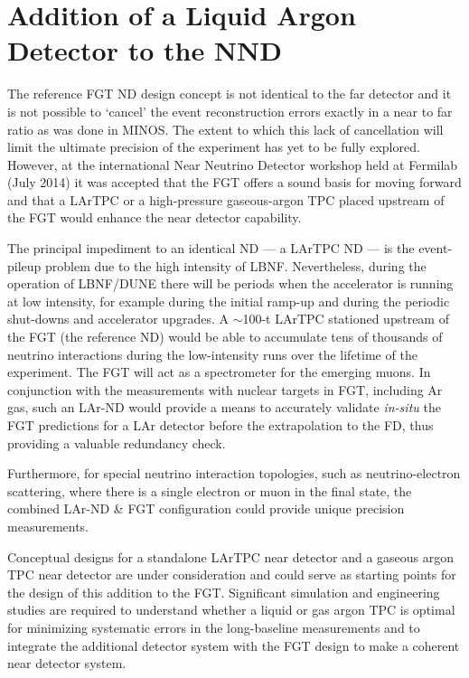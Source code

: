 \section{Addition of a Liquid Argon Detector to the NND}
\label{sec:detectors-nd-alt}

The reference FGT ND design concept is not
identical to the far detector and it is not possible
to `cancel' the event reconstruction errors exactly in a near to far
ratio as was done in MINOS.  The extent to which this lack of
cancellation will limit the ultimate precision of the experiment has
yet to be fully explored.  However, at the international Near Neutrino
Detector workshop held at Fermilab (July 2014) it was accepted that
the FGT offers a sound basis for moving forward and that a LArTPC
or a high-pressure gaseous-argon TPC placed upstream of the FGT would
enhance the near detector capability.


The principal impediment to an
identical ND --- a LArTPC ND --- is the event-pileup problem
due to the high intensity of LBNF. Nevertheless, during the operation
of LBNF/DUNE there will be periods when the accelerator is running at
low intensity, for example during the initial ramp-up and during the
periodic shut-downs and accelerator upgrades. A $\sim$100-t LArTPC
stationed upstream of the FGT (the reference ND) would be able to
accumulate tens of thousands of neutrino interactions during the
low-intensity runs over the lifetime of the experiment.  The FGT will
act as a spectrometer for the emerging muons. In conjunction with the
measurements with nuclear targets in FGT, including Ar gas, such an
LAr-ND would provide a means to accurately validate {\em in-situ} the
FGT predictions for a LAr detector before the extrapolation to the FD,
thus providing a valuable redundancy check.

Furthermore, for special neutrino interaction topologies, such as
neutrino-electron scattering, where there is a single electron or muon
in the final state, the combined LAr-ND \& FGT configuration could
provide unique precision measurements.

Conceptual designs for a standalone LArTPC near detector and a
gaseous argon TPC near detector are under consideration and
could serve as starting points for the design of this addition to the
FGT.  Significant simulation and engineering studies are required to
understand whether a liquid or gas argon TPC is optimal for minimizing
systematic errors in the long-baseline measurements and to integrate
the additional detector system with the FGT design to make a coherent
near detector system.

